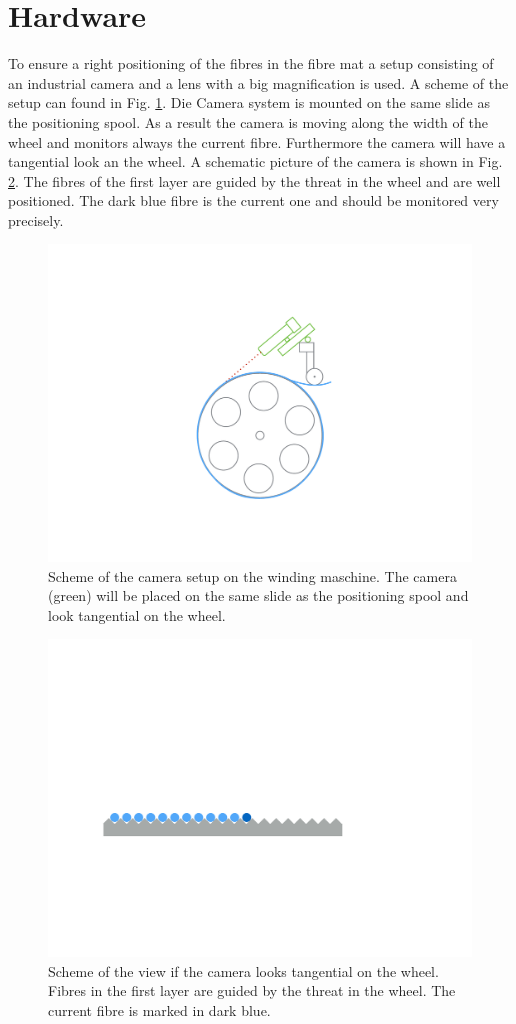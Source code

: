 \section{Hardware}
\label{sec:Hardware}
 
 To ensure a right positioning of the fibres in the fibre mat a setup consisting of an industrial camera and a lens with a big magnification is used. A scheme of the setup can found in Fig. \ref{hardwarescheme}. Die Camera system is mounted on the same slide as the positioning spool. As a result the camera is moving along the width of the wheel and monitors always the current fibre. Furthermore the camera will have a tangential look an the wheel. A schematic picture of the camera is shown in Fig. \ref{viewscheme}. The fibres of the first layer are guided by the threat in the wheel and are well positioned. The dark blue fibre is the current one and should be monitored very precisely. 
\begin{figure}[tb]
\begin{center}
\includegraphics[width=0.5\linewidth]{figs/hardwarescheme.pdf}%
\caption{Scheme of the camera setup on the winding maschine. The camera (green) will be placed on the same slide as the positioning spool and look tangential on the wheel. \label{hardwarescheme}}
\end{center}
\end{figure}
\begin{figure}[tb]
\begin{center}
\includegraphics[width=0.5\linewidth]{figs/viewscheme.pdf}%
\caption{Scheme of the view if the camera looks tangential on the wheel. Fibres in the first layer are guided by the threat in the wheel. The current fibre is marked in dark blue.\label{viewscheme}}
\end{center}
\end{figure}

